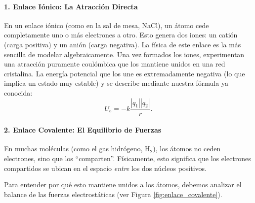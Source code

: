 \documentclass[11pt,a4paper]{book}
\begin{document}
\paragraph{1. Enlace Iónico: La Atracción Directa}
En un enlace iónico (como en la sal de mesa, NaCl), un átomo cede completamente uno o más electrones a otro. Esto genera dos iones: un catión (carga positiva) y un anión (carga negativa). 
La física de este enlace es la más sencilla de modelar algebraicamente. Una vez formados los iones, experimentan una atracción puramente coulómbica que los mantiene unidos en una red cristalina. La energía potencial que los une es extremadamente negativa (lo que implica un estado muy estable) y se describe mediante nuestra fórmula ya conocida:
\begin{equation}
    U_e = -k \frac{|q_1| |q_2|}{r}.
\end{equation}

\paragraph{2. Enlace Covalente: El Equilibrio de Fuerzas}
En muchas moléculas (como el gas hidrógeno, $\text{H}_2$), los átomos no ceden electrones, sino que los ``comparten''. Físicamente, esto significa que los electrones compartidos se ubican en el espacio \textit{entre} los dos núcleos positivos.

Para entender por qué esto mantiene unidos a los átomos, debemos analizar el balance de las fuerzas electrostáticas (ver Figura \ref{fig:enlace_covalente}).
\end{document}

